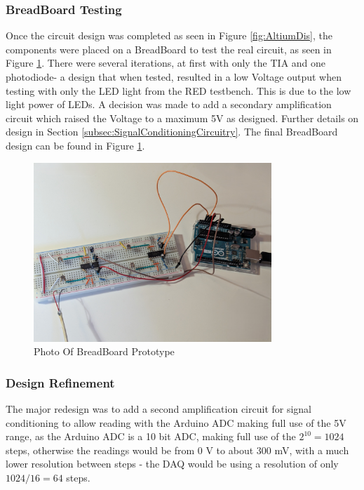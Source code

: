 %
%
\subsubsection*{BreadBoard Testing}

Once the circuit design was completed as seen in Figure  \ref{fig:AltiumDis}, the components were placed on a BreadBoard to test the real circuit, as seen in Figure \ref{fig:BreadBoardPhoto}. 
There were several iterations, at first with only the \ac{TIA} and one photodiode- a design that when tested, resulted in a low Voltage output when testing with only the LED light from the \ac{RED} testbench. This is due to the low light power of LEDs. A decision was made to add a secondary amplification circuit which raised the Voltage to a maximum 5V as designed. Further details on design in Section \ref{subsec:SignalConditioningCircuitry}. The final BreadBoard design can be found in Figure \ref{fig:BreadBoardPhoto}.



%
\begin{figure}[htbp] %
  \centering
  \includegraphics[width=0.8\textwidth]{chapters/methodology/prototype/BreadBoardPhoto.jpg}
  \caption{Photo Of BreadBoard Prototype}
  \label{fig:BreadBoardPhoto}
\end{figure}



\subsubsection*{Design Refinement}
The major redesign was to add a second amplification circuit for signal conditioning to allow reading with the Arduino ADC making full use of the 5V range, as the Arduino ADC is a 10 bit ADC, making full use of the $2^{10}=1024$ steps, otherwise the readings would be from 0 V to about 300 mV, with a much lower resolution between steps - the DAQ would be using a resolution of only $1024/16=64$ steps. 



